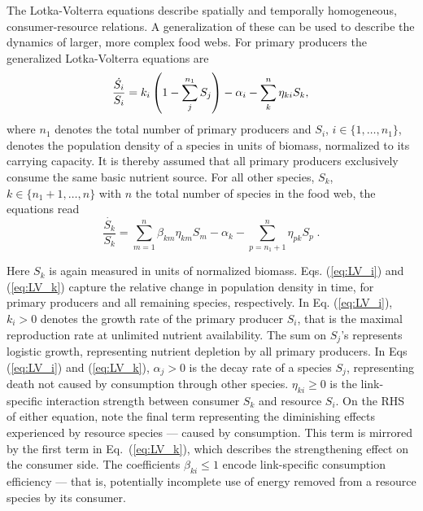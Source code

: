 The Lotka-Volterra equations \cite{lotka1926elements,volterra1927variazioni} describe spatially and temporally homogeneous, %
consumer-resource relations. A generalization of these \cite{hofbauertheory, campbell1961conditions, drossel2003handbook} can be used to describe the dynamics of larger, more complex food webs. 
For primary producers the generalized Lotka-Volterra equations are
\begin{equation}
        \frac{\dot{S_i}}{S_i} = k_i \left( 1 - \sum_j^{n_1} S_j \right) - \alpha_i - \sum_k^{n} \eta_{ki} S_k, \label{eq:LV_i}\; \\
\end{equation}
where $n_1$ denotes the total number of primary producers and $S_i$, $i\in\{1,\dots,n_1\}$, denotes the population density of a species in units of biomass, normalized to its carrying capacity. 
It is thereby assumed that all primary producers exclusively consume the same basic nutrient source. 
For all other species, $S_k$, $k\in\{n_1+1,\dots,n\}$ with $n$ the total number of species in the food web, the equations read 
\begin{equation}
     \frac{\dot{S_k}}{S_k} =  \sum_{m=1}^{n} \beta_{km}\eta_{km} S_m - \alpha_k - \sum_{p=n_1+1}^{n} \eta_{pk} S_p\;. \label{eq:LV_k}
\end{equation}

Here $S_k$ is again measured in units of normalized biomass. 
Eqs. (\ref{eq:LV_i}) and (\ref{eq:LV_k}) capture the relative change in population density in time, for primary producers and all remaining species, respectively. 
In Eq. (\ref{eq:LV_i}), $k_i>0$ denotes the growth rate of the primary producer $S_i$, that is the maximal reproduction rate at unlimited nutrient availability.
The sum on $S_j$'s represents logistic growth, representing nutrient depletion by all primary producers. 
In Eqs (\ref{eq:LV_i}) and (\ref{eq:LV_k}), $\alpha_j>0$ is the decay rate of a species $S_j$, representing death not caused by consumption through other species. 
$\eta_{ki}\geq 0$ is the link-specific interaction strength between consumer $S_k$ and resource $S_i$. 
On the RHS of either equation, note the final term representing the diminishing effects experienced by resource species --- caused by consumption. 
This term is mirrored by the first term in Eq.~(\ref{eq:LV_k}), which describes the strengthening effect on the consumer side.
The coefficients $\beta_{ki}\leq 1$ encode link-specific consumption efficiency --- that is, potentially incomplete use of energy removed from a resource species by its consumer.

